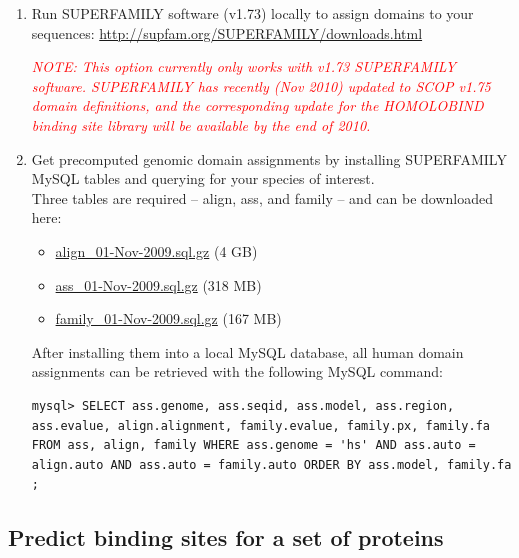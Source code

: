 \documentclass[11pt]{article}
\begin{document}
\begin{enumerate}
\item Run SUPERFAMILY software (v1.73) locally to assign domains to your sequences: \url{http://supfam.org/SUPERFAMILY/downloads.html}

{\em \textcolor{red}{NOTE: This option currently only works with v1.73 SUPERFAMILY software. SUPERFAMILY has recently (Nov 2010) updated to SCOP v1.75 domain definitions, and the corresponding update for the HOMOLOBIND binding site library will be available by the end of 2010.}}

\item Get precomputed genomic domain assignments by installing SUPERFAMILY MySQL tables and querying for your species of interest.\\

Three tables are required -- align, ass, and family -- and can be downloaded here:
\begin{itemize}
\item \href{http://pibase.janelia.org/download/homolobind/v1.1/align_01-Nov-2009.sql.gz}{align\_01-Nov-2009.sql.gz} (4 GB)\\
\item \href{http://pibase.janelia.org/download/homolobind/v1.1/ass_01-Nov-2009.sql.gz}{ass\_01-Nov-2009.sql.gz} (318 MB)\\
\item \href{http://pibase.janelia.org/download/homolobind/v1.1/family_01-Nov-2009.sql.gz}{family\_01-Nov-2009.sql.gz} (167 MB)\\
\end{itemize}

After installing them into a local MySQL database, all human domain assignments can be retrieved with the following MySQL command:

\lstset{breaklines=true,language=sql,breakatwhitespace=true}
\lstset{frame=single}
\lstset{basicstyle=\ttfamily}
\begin{lstlisting}
mysql> SELECT ass.genome, ass.seqid, ass.model, ass.region, ass.evalue, align.alignment, family.evalue, family.px, family.fa FROM ass, align, family WHERE ass.genome = 'hs' AND ass.auto = align.auto AND ass.auto = family.auto ORDER BY ass.model, family.fa ;
\end{lstlisting}
\end{enumerate}


\subsection{Predict binding sites for a set of proteins}
\end{document}
